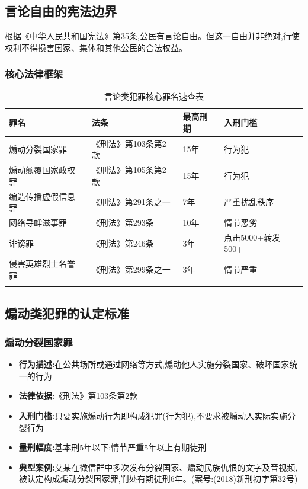 \documentclass[12pt,a4paper]{article}
\begin{document}
\subsection{言论自由的宪法边界}

根据《中华人民共和国宪法》第35条,公民有言论自由。但这一自由并非绝对,行使权利不得损害国家、集体和其他公民的合法权益。

\subsubsection{核心法律框架}

\begin{longtable}{p{2.5cm}p{3cm}p{2cm}p{5cm}}
  \toprule
  \textbf{罪名} & \textbf{法条} & \textbf{最高刑期} & \textbf{入刑门槛} \\
  \midrule
  煽动分裂国家罪 & 《刑法》第103条第2款 & 15年 & 行为犯 \\
  煽动颠覆国家政权罪 & 《刑法》第105条第2款 & 15年 & 行为犯 \\
  编造传播虚假信息罪 & 《刑法》第291条之一 & 7年 & 严重扰乱秩序 \\
  网络寻衅滋事罪 & 《刑法》第293条 & 10年 & 情节恶劣 \\
  诽谤罪 & 《刑法》第246条 & 3年 & 点击5000+转发500+ \\
  侵害英雄烈士名誉罪 & 《刑法》第299条之一 & 3年 & 情节严重 \\
  \bottomrule
  \caption{言论类犯罪核心罪名速查表}
\end{longtable}

\subsection{煽动类犯罪的认定标准}

\subsubsection{煽动分裂国家罪}
\begin{itemize}
  \item \textbf{行为描述:}在公共场所或通过网络等方式,煽动他人实施分裂国家、破坏国家统一的行为
  \item \textbf{法律依据:}《刑法》第103条第2款
  \item \textbf{入刑门槛:}只要实施煽动行为即构成犯罪(行为犯),不要求被煽动人实际实施分裂行为
  \item \textbf{量刑幅度:}基本刑5年以下;情节严重5年以上有期徒刑
  \item \textbf{典型案例:}艾某在微信群中多次发布分裂国家、煽动民族仇恨的文字及音视频,被认定构成煽动分裂国家罪,判处有期徒刑6年。(案号:(2018)新刑初字第32号)
\end{itemize}
\end{document}
